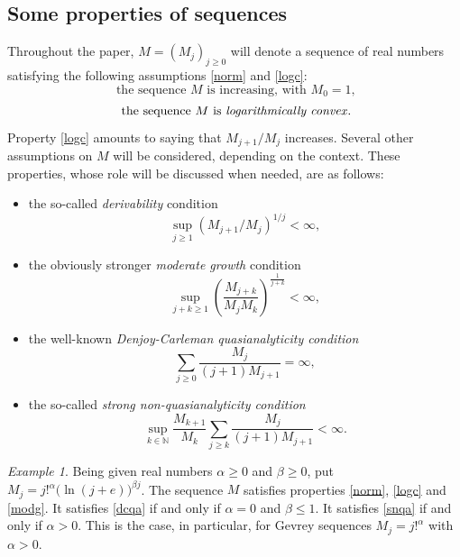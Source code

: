 \documentclass[a4paper]{amsart}
\theoremstyle{plain}
\theoremstyle{remark}
\newtheorem*{exam}{Example}
\begin{document}
\subsection{Some properties of sequences}\label{spos}
Throughout the paper, $ M=(M_j)_{j\geq 0} $ will denote a sequence of real numbers satisfying the following assumptions \eqref{norm} and \eqref{logc}:
\begin{equation}\label{norm}
\text{ the sequence } M \text{ is increasing, with } M_0=1,
\end{equation}
\begin{equation}\label{logc}
\text{ the sequence } M \text{ is \emph{logarithmically convex}}.
\end{equation}
Property \eqref{logc} amounts to saying that $ M_{j+1}/M_j $ increases. Several other assumptions on $ M $ will be considered, depending on the context. These properties, whose role will be discussed when needed, are as follows: 
\begin{itemize}
\item the so-called \emph{derivability} condition
\begin{equation}\label{stabder}
\sup_{j\geq 1}(M_{j+1}/M_j)^{1/j}<\infty,
\end{equation}
\item the obviously stronger \emph{moderate growth} condition
\begin{equation}\label{modg}
\sup_{j+k\geq 1}\left(\frac{M_{j+k}}{M_jM_k}\right)^{\frac{1}{j+k}}<\infty,
\end{equation}
\item the well-known \emph{Denjoy-Carleman quasianalyticity condition}
\begin{equation}\label{dcqa}
\sum_{j\geq 0}\frac{M_j}{(j+1)M_{j+1}}=\infty,
\end{equation}
\item the so-called \emph{strong non-quasianalyticity condition}
\begin{equation}\label{snqa}
\sup_{k\in\mathbb{N}}\frac{M_{k+1}}{M_k}\sum_{j\geq k}\frac{M_j}{(j+1)M_{j+1}}<\infty.
\end{equation}
\end{itemize}

\begin{exam} 
Being given real numbers $ \alpha\geq 0 $ and $ \beta\geq 0 $, put $ M_j=j!^\alpha\big(\ln(j+e)\big)^{\beta j} $. The sequence $ M $ satisfies properties \eqref{norm}, \eqref{logc} and \eqref{modg}. It satisfies \eqref{dcqa} if and only if $ \alpha=0 $ and $ \beta \leq 1 $. It satisfies \eqref{snqa} if and only if $ \alpha>0 $. This is the case, in particular, for Gevrey sequences $ M_j=j!^\alpha  $ with $ \alpha>0 $.
\end{exam}
\end{document}
